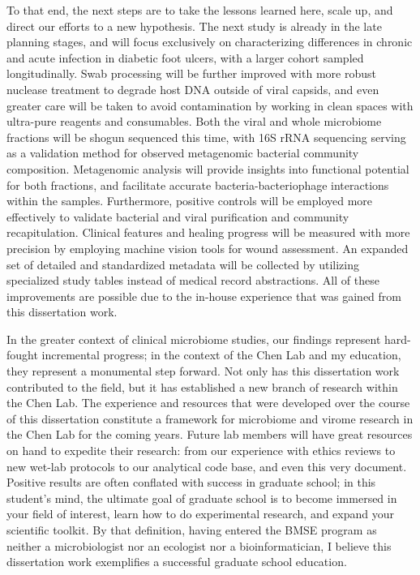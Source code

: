 \documentclass[oneside,12pt,final]{sty/ucthesis-CA2012}
\begin{document}
\begin{mainmatter}
To that end, the next steps are to take the lessons learned here, scale up, and direct our efforts to a new hypothesis. The next study is already in the late planning stages, and will focus exclusively on characterizing differences in chronic and acute infection in diabetic foot ulcers, with a larger cohort sampled longitudinally. Swab processing will be further improved with more robust nuclease treatment to degrade host DNA outside of viral capsids, and even greater care will be taken to avoid contamination by working in clean spaces with ultra-pure reagents and consumables. Both the viral and whole microbiome fractions will be shogun sequenced this time, with 16S rRNA sequencing serving as a validation method for observed metagenomic bacterial community composition. Metagenomic analysis will provide insights into functional potential for both fractions, and facilitate accurate bacteria-bacteriophage interactions within the samples. Furthermore, positive controls will be employed more effectively to validate bacterial and viral purification and community recapitulation. Clinical features and healing progress will be measured with more precision by employing machine vision tools for wound assessment. An expanded set of detailed and standardized metadata will be collected by utilizing specialized study tables instead of medical record abstractions. All of these improvements are possible due to the in-house experience that was gained from this dissertation work. 

In the greater context of clinical microbiome studies, our findings represent hard-fought incremental progress; in the context of the Chen Lab and my education, they represent a monumental step forward. Not only has this dissertation work contributed to the field, but it has established a new branch of research within the Chen Lab. The experience and resources that were developed over the course of this dissertation constitute a framework for microbiome and virome research in the Chen Lab for the coming years. Future lab members will have great resources on hand to expedite their research: from our experience with ethics reviews to new wet-lab protocols to our analytical code base, and even this very document. Positive results are often conflated with success in graduate school; in this student's mind, the ultimate goal of graduate school is to become immersed in your field of interest, learn how to do experimental research, and expand your scientific toolkit. By that definition, having entered the BMSE program as neither a microbiologist nor an ecologist nor a bioinformatician, I believe this dissertation work exemplifies a successful graduate school education.


\end{mainmatter}
\end{document}
